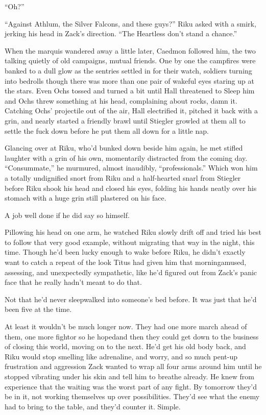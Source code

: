 ``Oh?''

``Against Athlum, the Silver Falcons, and these guys?'' Riku asked with a smirk, jerking his head in Zack's direction. ``The Heartless don't stand a chance.''

When the marquis wandered away a little later, Caedmon followed him, the two talking quietly of old campaigns, mutual friends. One by one the campfires were banked to a dull glow as the sentries settled in for their watch, soldiers turning into bedrolls though there was more than one pair of wakeful eyes staring up at the stars. Even Ochs tossed and turned a bit until Hall threatened to Sleep him and Ochs threw something at his head, complaining about rocks, damn it. Catching Ochs' projectile out of the air, Hall electrified it, pitched it back with a grin, and nearly started a friendly brawl until Stiegler growled at them all to settle the fuck down before he put them all down for a little nap.

Glancing over at Riku, who'd bunked down beside him again, he met stifled laughter with a grin of his own, momentarily distracted from the coming day. ``Consummate,'' he murmured, almost inaudibly, ``professionals.'' Which won him a totally undignified snort from Riku and a half-hearted snarl from Stiegler before Riku shook his head and closed his eyes, folding his hands neatly over his stomach with a huge grin still plastered on his face.

A job well done if he did say so himself.

Pillowing his head on one arm, he watched Riku slowly drift off and tried his best to follow that very good example, without migrating that way in the night, this time. Though he'd been lucky enough to wake before Riku, he didn't exactly want to catch a repeat of the look Titus had given him that morning\textemdash amused, assessing, and unexpectedly sympathetic, like he'd figured out from Zack's panic face that he really hadn't meant to do that.

Not that he'd never sleepwalked into someone's bed before. It was just that he'd been five at the time.

At least it wouldn't be much longer now. They had one more march ahead of them, one more fight\textemdash or so he hoped\textemdash and then they could get down to the business of closing this world, moving on to the next. He'd get his old body back, and Riku would stop smelling like adrenaline, and worry, and so much pent-up frustration and aggression Zack wanted to wrap all four arms around him until he stopped vibrating under his skin and tell him to breathe already. He knew from experience that the waiting was the worst part of any fight. By tomorrow they'd be in it, not working themselves up over possibilities. They'd see what the enemy had to bring to the table, and they'd counter it. Simple.

